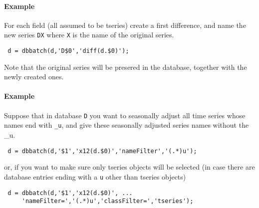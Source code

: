  \paragraph{Example}
 
 For each field (all assumed to be tseries) create a first difference,
 and name the new series \texttt{DX} where \texttt{X} is the name of the
 original series.
 
 \begin{verbatim}
 d = dbbatch(d,'D$0','diff(d.$0)');
 \end{verbatim}
 
 Note that the original series will be presered in the database, together
 with the newly created ones.
 
 \paragraph{Example}
 
 Suppose that in database \texttt{D} you want to seasonally adjust all
 time series whose names end with \texttt{\_u}, and give these seasonally
 adjusted series names without the \_u.
 
 \begin{verbatim}
 d = dbbatch(d,'$1','x12(d.$0)','nameFilter','(.*)u');
 \end{verbatim}
 
 or, if you want to make sure only tseries objects will be selected (in
 case there are database entries ending with a \texttt{u} other than
 tseries objects)
 
 \begin{verbatim}
 d = dbbatch(d,'$1','x12(d.$0)', ...
     'nameFilter=','(.*)u','classFilter=','tseries');
 \end{verbatim}


